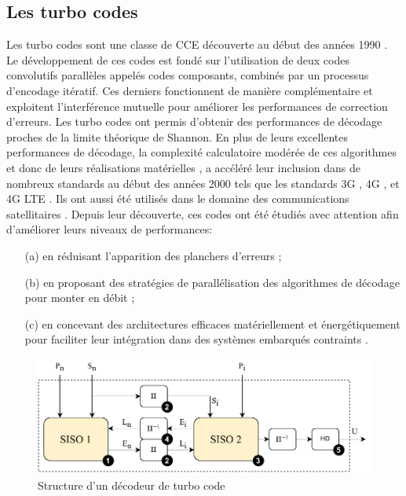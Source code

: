 \documentclass[../main.tex]{subfiles}
\begin{document}
\subsection{Les turbo codes}
%
%
%
%
Les turbo codes sont une classe de CCE découverte au début des années 1990  \cite{TURBO:BERROU, BookCodes}. Le développement de ces codes est fondé sur l'utilisation de deux codes convolutifs parallèles appelés codes composants, combinés par un processus d'encodage itératif. Ces derniers fonctionnent de manière complémentaire et exploitent l'interférence mutuelle pour améliorer les performances de correction d'erreurs. 
Les turbo codes ont permis d’obtenir des performances de décodage proches de la limite théorique de Shannon. 
En plus de leurs excellentes performances de décodage, la complexité calculatoire modérée de ces algorithmes et donc de leurs réalisations matérielles \cite{TURBO:TEN}, a accéléré leur inclusion dans de nombreux standards au début des années 2000 tels que les standards 3G \cite{3G}, 4G \cite{4G}, et 4G LTE \cite{Ref_4G}. Ils ont aussi été utilisés dans le domaine des communications satellitaires  \cite{CCSDS:TURBO,DVB:RCS}.
Depuis leur découverte, ces codes ont été étudiés avec attention  \cite{TURBO:SURVEY} afin d’améliorer leurs niveaux de performances: 
\begin{itemize}
    \item[(a)] en réduisant l’apparition des planchers d’erreurs  \cite{TURBO:NEW:INTERL} ;
    \item[(b)] en proposant des stratégies de parallélisation des algorithmes de décodage pour monter en débit  \cite{TURBO:ALGO1,TURBO:PIPE} ;
    \item[(c)] en concevant des architectures efficaces matériellement et énergétiquement pour faciliter leur intégration dans des systèmes embarqués contraints \cite{TURBO:HARD1,TURBO:HARD2,TURBO:HARD3}.
\end{itemize} 

\begin{figure}[b]
    \centering
    \includegraphics[scale=1]{chapter2/figs/siso_turbo.pdf}
    \caption{Structure d’un décodeur de turbo code }
    \label{TURBO1}
\end{figure}
\end{document}
